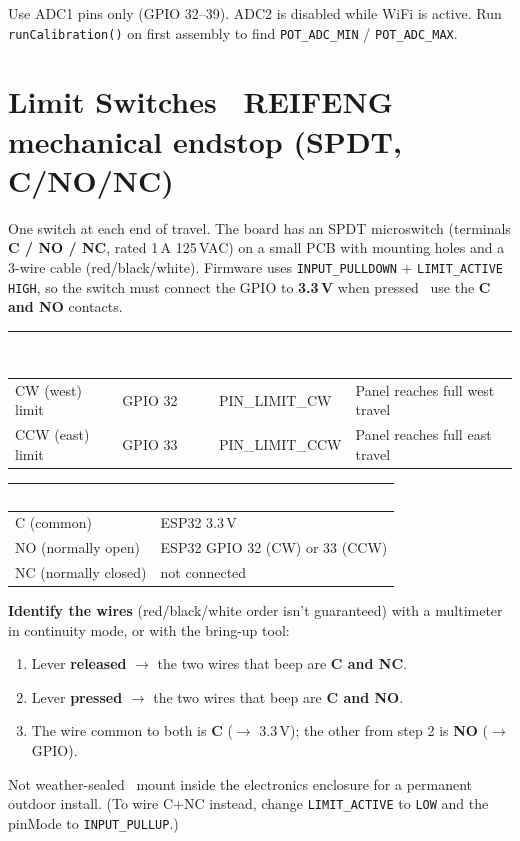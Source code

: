 \documentclass[11pt]{article}
\newcommand{\tc}[1]{\textcolor{white}{\textbf{#1}}}   %
\newcommand{\nd}{\textrm{\textemdash}}                %
\begin{document}
\begin{notebox}
Use ADC1 pins only (GPIO 32--39). ADC2 is disabled while WiFi is active.
Run \texttt{runCalibration()} on first assembly to find \texttt{POT_ADC_MIN} /
\texttt{POT_ADC_MAX}.
\end{notebox}

\section*{Limit Switches \nd\ REIFENG mechanical endstop (SPDT, C/NO/NC)}
One switch at each end of travel. The board has an SPDT microswitch (terminals
\textbf{C / NO / NC}, rated 1\,A 125\,VAC) on a small PCB with mounting holes and
a 3-wire cable (red/black/white). Firmware uses \texttt{INPUT_PULLDOWN} +
\texttt{LIMIT_ACTIVE HIGH}, so the switch must connect the GPIO to \textbf{3.3\,V}
when pressed \nd\ use the \textbf{C and NO} contacts.

\smallskip
{}
\begin{xltabular}{\textwidth}{@{}P{3cm} P{2.4cm} T{2.8cm} L@{}}
\toprule
{}\tc{Switch} & \tc{ESP32 GPIO} & \tc{Config symbol} & \tc{Triggers when\dots}\\
\midrule\endhead
CW (west) limit & GPIO 32 & PIN_LIMIT_CW & Panel reaches full west travel\\
CCW (east) limit & GPIO 33 & PIN_LIMIT_CCW & Panel reaches full east travel\\
\bottomrule
\end{xltabular}

\smallskip
{}
\begin{xltabular}{\textwidth}{@{}P{4cm} L@{}}
\toprule
{}\tc{Switch contact} & \tc{Connect to}\\
\midrule\endhead
C (common) & ESP32 3.3\,V\\
NO (normally open) & ESP32 GPIO 32 (CW) or 33 (CCW)\\
NC (normally closed) & not connected\\
\bottomrule
\end{xltabular}

\begin{notebox}
\textbf{Identify the wires} (red/black/white order isn't guaranteed) with a
multimeter in continuity mode, or with the bring-up tool:
\begin{enumerate}
  \item Lever \textbf{released} $\rightarrow$ the two wires that beep are
        \textbf{C and NC}.
  \item Lever \textbf{pressed} $\rightarrow$ the two wires that beep are
        \textbf{C and NO}.
  \item The wire common to both is \textbf{C} ($\rightarrow$ 3.3\,V); the other
        from step 2 is \textbf{NO} ($\rightarrow$ GPIO).
\end{enumerate}
Not weather-sealed \nd\ mount inside the electronics enclosure for a permanent
outdoor install. (To wire C+NC instead, change \texttt{LIMIT_ACTIVE} to
\texttt{LOW} and the pinMode to \texttt{INPUT_PULLUP}.)
\end{notebox}
\end{document}
